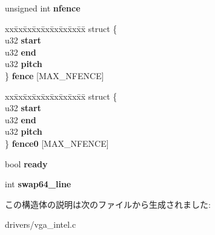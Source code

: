 \begin{DoxyCompactItemize}
\item 
unsigned int {\bfseries nfence}\label{structvga__func__data_a0b4762a451ace362c83a76e15c7e3838}

\item 
\begin{tabbing}
xx\=xx\=xx\=xx\=xx\=xx\=xx\=xx\=xx\=\kill
struct \{\\
\>u32 {\bfseries start}\\
\>u32 {\bfseries end}\\
\>u32 {\bfseries pitch}\\
\} {\bfseries fence} [MAX\_NFENCE]\label{structvga__func__data_afc004afd8ce42d222797fddc0fb297b6}
\\

\end{tabbing}\item 
\begin{tabbing}
xx\=xx\=xx\=xx\=xx\=xx\=xx\=xx\=xx\=\kill
struct \{\\
\>u32 {\bfseries start}\\
\>u32 {\bfseries end}\\
\>u32 {\bfseries pitch}\\
\} {\bfseries fence0} [MAX\_NFENCE]\label{structvga__func__data_a7f5e032017c166441ad1c7a35550be13}
\\

\end{tabbing}\item 
bool {\bfseries ready}\label{structvga__func__data_aaba548bd872cbe640d03ebf21b7463fe}

\item 
int {\bfseries swap64\-\_\-line}\label{structvga__func__data_ad31b8168d0df24cdd5dbf5ecc83ec4ff}

\end{DoxyCompactItemize}


この構造体の説明は次のファイルから生成されました\-:\begin{DoxyCompactItemize}
\item 
drivers/vga\-\_\-intel.\-c\end{DoxyCompactItemize}
